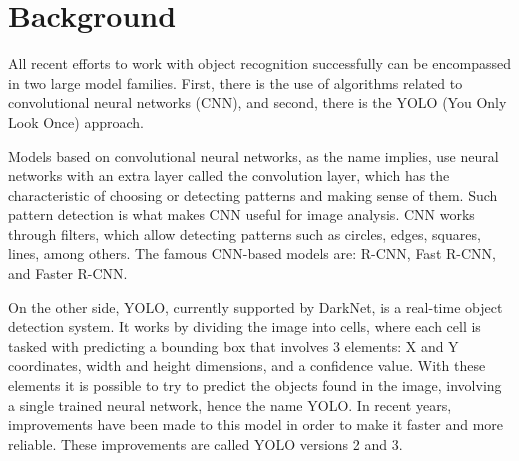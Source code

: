 \section{Background}

All recent efforts to work with object recognition successfully can be 
encompassed in two large model families. First, there is the use of algorithms 
related to convolutional neural networks (CNN), and second, there is the YOLO 
(You Only Look Once) approach.

Models based on convolutional neural networks, as the name implies, use neural 
networks with an extra layer called the convolution layer, which has the 
characteristic of choosing or detecting patterns and making sense of them. 
Such pattern detection is what makes CNN useful for image analysis. CNN works 
through filters, which allow detecting patterns such as circles, edges, squares, 
lines, among others. The famous CNN-based models are: R-CNN, Fast R-CNN, and 
Faster R-CNN.

On the other side, YOLO, currently supported by DarkNet, is a real-time object 
detection system. It works by dividing the image into cells, where each cell is 
tasked with predicting a bounding box that involves 3 elements: X and Y 
coordinates, width and height dimensions, and a confidence value. With these 
elements it is possible to try to predict the objects found in the image, 
involving a single trained neural network, hence the name YOLO. In recent years, 
improvements have been made to this model in order to make it faster and more 
reliable. These improvements are called YOLO versions 2 and 3.

